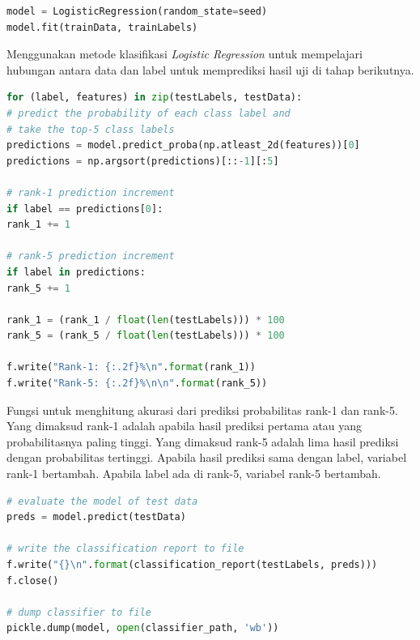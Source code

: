\begin{lstlisting}[language=python, caption=Penyesuaian dengan \textit{Logistic Regression}, label=code:logistic, firstnumber=65]
model = LogisticRegression(random_state=seed)
model.fit(trainData, trainLabels)
\end{lstlisting}
\par Menggunakan metode klasifikasi \textit{Logistic Regression} untuk mempelajari hubungan antara data dan label untuk memprediksi hasil uji di tahap berikutnya.

\begin{lstlisting}[language=python, caption=Melakukan Prediksi Probabilitas, label=code:predict_proba, firstnumber=74]
for (label, features) in zip(testLabels, testData):
# predict the probability of each class label and
# take the top-5 class labels
predictions = model.predict_proba(np.atleast_2d(features))[0]
predictions = np.argsort(predictions)[::-1][:5]

# rank-1 prediction increment
if label == predictions[0]:
rank_1 += 1

# rank-5 prediction increment
if label in predictions:
rank_5 += 1

rank_1 = (rank_1 / float(len(testLabels))) * 100
rank_5 = (rank_5 / float(len(testLabels))) * 100

f.write("Rank-1: {:.2f}%\n".format(rank_1))
f.write("Rank-5: {:.2f}%\n\n".format(rank_5))

\end{lstlisting}
\par Fungsi untuk menghitung akurasi dari prediksi probabilitas rank-1 dan rank-5. Yang dimaksud rank-1 adalah apabila hasil prediksi pertama atau yang probabilitasnya paling tinggi. Yang dimaksud rank-5 adalah lima hasil prediksi dengan probabilitas tertinggi. Apabila hasil prediksi sama dengan label, variabel rank-1 bertambah. Apabila label ada di rank-5, variabel rank-5 bertambah.

\begin{lstlisting}[language=python, caption=Menyimpan model dan hasil, label=code:save_model, firstnumber=105]
# evaluate the model of test data
preds = model.predict(testData)

# write the classification report to file
f.write("{}\n".format(classification_report(testLabels, preds)))
f.close()

# dump classifier to file
pickle.dump(model, open(classifier_path, 'wb'))

\end{lstlisting}

